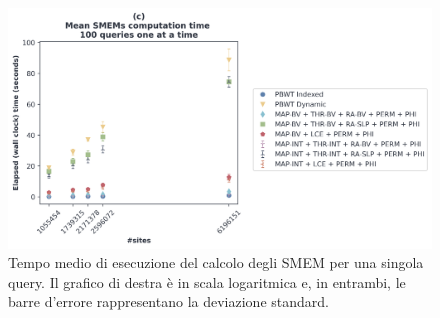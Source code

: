 \begin{figure}
  \centering
  \includegraphics[width=\textwidth]{img/exe_time_single_paper.png}
  \caption{Tempo medio di esecuzione del calcolo degli SMEM per una singola
    query. Il grafico di destra è in scala logaritmica e, in entrambi, le
    barre d'errore rappresentano la deviazione standard.}
  \label{fig:smemsinglechr}
\end{figure}
